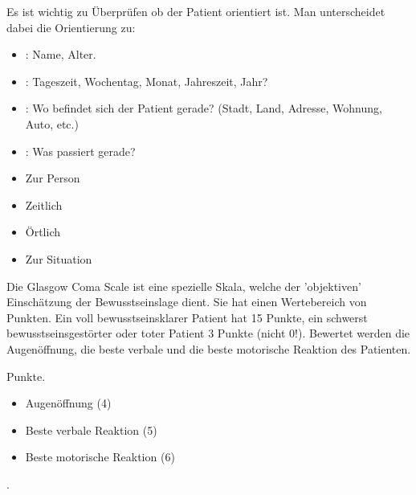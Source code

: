 {%
\label{topic:orientierung}
%
Es ist wichtig zu Überprüfen ob der Patient orientiert ist.
Man unterscheidet dabei die Orientierung zu:  
\begin{itemize}
  \item {}: Name, Alter.
  \item {}: Tageszeit,
  Wochentag, Monat, Jahreszeit, Jahr?
  \item {}: Wo befindet sich der Patient gerade?
  \newline
  (Stadt, Land, Adresse, Wohnung, Auto, etc.)
  \item {}: Was passiert gerade?
\end{itemize}

}{
\begin{itemize}
    \item Zur Person
    \item Zeitlich
    \item Örtlich
    \item Zur Situation
\end{itemize}
}{}{}{}

{%
\label{topic:gcs}
%
Die Glasgow Coma Scale ist eine spezielle Skala, welche der
'objektiven' Einschätzung der Bewusstseinslage  dient. Sie
hat einen Wertebereich von  Punkten. Ein voll
bewusstseinsklarer Patient hat 15 Punkte, ein schwerst
bewusstseinsgestörter oder toter Patient 3 Punkte (nicht
0!). Bewertet werden die Augenöffnung, die beste verbale und
die beste motorische Reaktion des
Patienten.
}{
 Punkte.
\begin{itemize}
    \item Augenöffnung (4)
    \item Beste verbale Reaktion (5)
    \item Beste motorische Reaktion (6)
\end{itemize}
.
}{}{}{}



